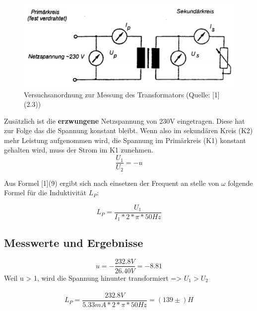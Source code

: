 \documentclass[12pt,a4paper]{article}
\begin{document}
\begin{multicols}{2}
\begin{figure}[H]
	\centering
	\includegraphics[scale=0.40]{./figure/schaltskizze_trafo.png}
	\caption{Versuchsanordnung zur Messung des Transformators (Quelle: [1](2.3))}
	\label{fig:schaltung_trafo}
\end{figure}
\noindent
Zusätzlich ist die \textbf{erzwungene} Netzspannung von 230V eingetragen. Diese hat zur Folge das die Spannung konstant bleibt. Wenn also im sekundären Kreis (K2) mehr Leistung aufgenommen wird, die Spannung im Primärkreis (K1) konstant gehalten wird, muss der Strom im K1 zunehmen.\\

$$\frac{U_1}{U_2} = -u$$

\noindent
Aus Formel [1](9) ergibt sich nach einsetzen der Frequent an stelle von $\omega$ folgende Formel für die Induktivität $L_P$:

$$L_P = \frac{U_1}{I_1 * 2*\pi * 50Hz}$$

\subsection{Messwerte und Ergebnisse}

$$u = -\frac{232.8V}{26.40V} = -8.81$$
\noindent
Weil u > 1, wird die Spannung hinunter transformiert => $U_1 > U_2$ \\
\\
$$L_P = \frac{232.8V}{5.33mA *2*\pi * 50 Hz} = (139 \pm )H$$

\end{multicols}
\end{document}
